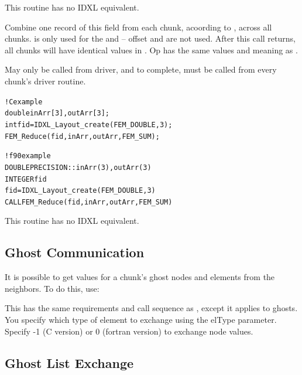 \documentclass[10pt]{article}
\begin{document}
     This routine has no IDXL equivalent.



     Combine one record of this field from each chunk, acoording to , 
 across all chunks.
 is only used for the  and -- offset and
 are not used.  After this call returns, all chunks will have
identical values in .  Op has the same values and meaning as
.

     May only be called from driver, and to complete, must be called
     from every chunk's driver routine.

\begin{alltt}
! C example
   double inArr[3], outArr[3];
   int fid=IDXL_Layout_create(FEM_DOUBLE,3);
   FEM_Reduce(fid,inArr,outArr,FEM_SUM);

! f90 example
   DOUBLE PRECISION :: inArr(3), outArr(3)
   INTEGER fid
   fid=IDXL_Layout_create(FEM_DOUBLE,3)
   CALL FEM_Reduce(fid,inArr,outArr,FEM_SUM)
\end{alltt}

     This routine has no IDXL equivalent.


\subsection{Ghost Communication}

It is possible to get values for a chunk's ghost nodes and elements from the neighbors. To do this, use:


This has the same requirements and call sequence as , except it applies to ghosts. You specify which type of element to exchange using the elType parameter. Specify -1 (C version) or 0 (fortran version) to exchange node values.  


\subsection{Ghost List Exchange}
\end{document}
